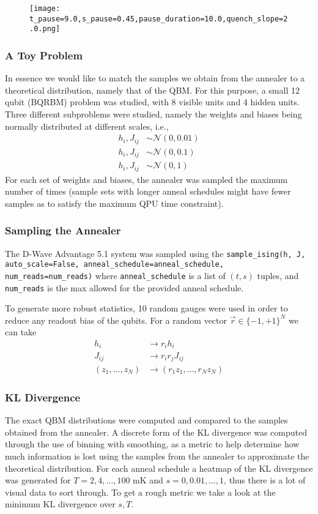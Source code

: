 \documentclass{beamer}
\begin{document}
\begin{frame}
    \begin{figure}
        \texttt{[image: t\_pause=9.0,s\_pause=0.45,pause\_duration=10.0,quench\_slope=2.0.png]}
    \end{figure}
\end{frame}

\begin{frame}
    \frametitle{A Toy Problem}
    In essence we would like to match the samples we obtain from the annealer to a theoretical distribution, namely that of the QBM.
    For this purpose, a small 12 qubit (BQRBM) problem was studied, with 8 visible units and 4 hidden units.
    Three different subproblems were studied, namely the weights and biases being normally distributed at different scales, i.e.,
    \begin{align*}
        h_i, J_{ij} &\sim \mathcal{N}(0, 0.01) \\
        h_i, J_{ij} &\sim \mathcal{N}(0, 0.1) \\
        h_i, J_{ij} &\sim \mathcal{N}(0, 1)
    \end{align*}
    For each set of weights and biases, the annealer was sampled the maximum number of times (sample sets with longer anneal schedules might have fewer samples as to satisfy the maximum QPU time constraint).
\end{frame}

\begin{frame}
    \frametitle{Sampling the Annealer}
    The D-Wave Advantage 5.1 system was sampled using the \texttt{sample\_ising(h, J, auto\_scale=False, anneal\_schedule=anneal\_schedule, num\_reads=num\_reads)}
    where \texttt{anneal\_schedule} is a list of \( (t, s) \) tuples, and \texttt{num\_reads} is the max allowed for the provided anneal schedule.

    To generate more robust statistics, 10 random gauges were used in order to reduce any readout bias of the qubits.
    For a random vector \( \vec{r} \in \{-1,+1\}^{N} \) we can take
    \begin{align*}
        h_i &\rightarrow r_i h_i \\
        J_{ij} &\rightarrow r_i r_j J_{ij} \\
        (z_1, \dots, z_N) &\rightarrow (r_1 z_1, \dots, r_N z_N)
    \end{align*}
\end{frame}

\begin{frame}
    \frametitle{KL Divergence}
    The exact QBM distributions were computed and compared to the samples obtained from the annealer.
    A discrete form of the KL divergence was computed through the use of binning with smoothing, as a metric to help determine how much information is lost using the samples from the annealer to approximate the theoretical distribution.
    For each anneal schedule a heatmap of the KL divergence was generated for \( T = 2, 4, \dots, 100 \) mK and \( s = 0, 0.01, \dots, 1 \), thus there is a lot of visual data to sort through.
    To get a rough metric we take a look at the minimum KL divergence over \( s, T \).
\end{frame}
\end{document}
